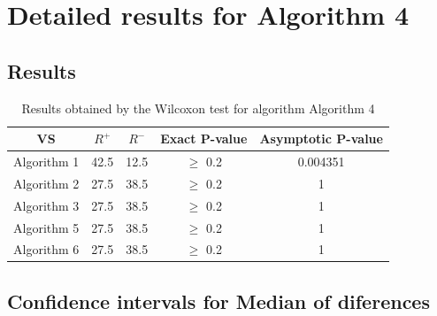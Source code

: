 \documentclass[a4paper,10pt]{article}
\begin{document}
 \clearpage 


\section{Detailed results for Algorithm 4}


\subsection{Results}

\begin{table}[!htp]
\centering\small
\begin{tabular}{
|c|c|c|c|c|}
\hline
 VS & $R^{+}$ & $R^{-}$ & Exact P-value & Asymptotic P-value \\ \hline 
Algorithm 1 & 42.5 & 12.5 & $\geq$ 0.2 & 0.004351\\ \hline 
Algorithm 2 & 27.5 & 38.5 & $\geq$ 0.2 & 1\\ \hline 
Algorithm 3 & 27.5 & 38.5 & $\geq$ 0.2 & 1\\ \hline 
Algorithm 5 & 27.5 & 38.5 & $\geq$ 0.2 & 1\\ \hline 
Algorithm 6 & 27.5 & 38.5 & $\geq$ 0.2 & 1\\ \hline 

\end{tabular}
\caption{Results obtained by the Wilcoxon test for algorithm Algorithm 4}
\end{table}

\subsection{Confidence intervals for Median of diferences}
\end{document}
